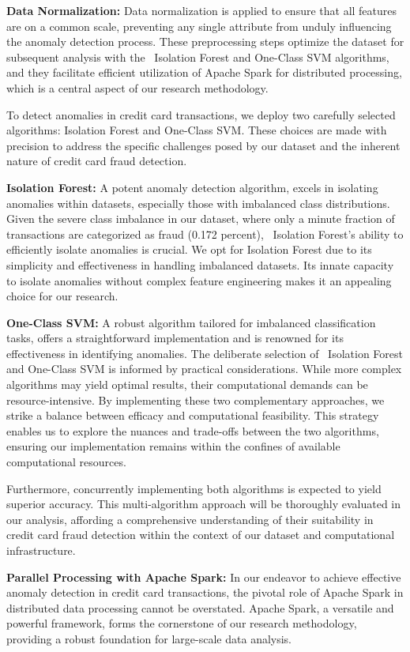 \documentclass[journal]{IEEEtran}
\begin{document}
\textbf{Data Normalization:} Data normalization is applied to ensure that all features are on a common scale, preventing any single attribute from unduly influencing the anomaly detection process. These preprocessing steps optimize the dataset for subsequent analysis with the ~Isolation Forest and One-Class SVM algorithms, and they facilitate efficient utilization of Apache Spark for distributed processing, which is a central aspect of our research methodology.

To detect anomalies in credit card transactions, we deploy two carefully selected algorithms: Isolation Forest and One-Class SVM. These choices are made with precision to address the specific challenges posed by our dataset and the inherent nature of credit card fraud detection.

\textbf{Isolation Forest:} A potent anomaly detection algorithm, excels in isolating anomalies within datasets, especially those with imbalanced class distributions. Given the severe class imbalance in our dataset, where only a minute fraction of transactions are categorized as fraud (0.172 percent), ~Isolation Forest's ability to efficiently isolate anomalies is crucial. We opt for Isolation Forest due to its simplicity and effectiveness in handling imbalanced datasets. Its innate capacity to isolate anomalies without complex feature engineering makes it an appealing choice for our research.

\textbf{One-Class SVM:} A robust algorithm tailored for imbalanced classification tasks, offers a straightforward implementation and is renowned for its effectiveness in identifying anomalies. The deliberate selection of ~Isolation Forest and One-Class SVM is informed by practical considerations. While more complex algorithms may yield optimal results, their computational demands can be resource-intensive. By implementing these two complementary approaches, we strike a balance between efficacy and computational feasibility. This strategy enables us to explore the nuances and trade-offs between the two algorithms, ensuring our implementation remains within the confines of available computational resources.

Furthermore, concurrently implementing both algorithms is expected to yield superior accuracy. This multi-algorithm approach will be thoroughly evaluated in our analysis, affording a comprehensive understanding of their suitability in credit card fraud detection within the context of our dataset and computational infrastructure.

\textbf{Parallel Processing with Apache Spark:} In our endeavor to achieve effective anomaly detection in credit card transactions, the pivotal role of Apache Spark in distributed data processing cannot be overstated. Apache Spark, a versatile and powerful framework, forms the cornerstone of our research methodology, providing a robust foundation for large-scale data analysis.
\end{document}
